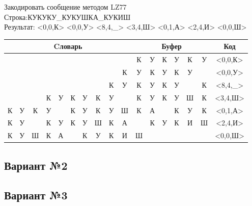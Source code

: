 \documentclass[a4paper, 12pt]{article}
\begin{document}
Закодировать сообщение методом LZ77\\
Строка:КУКУКУ\_КУКУШКА\_КУКИШ\\
Результат: <0,0,К> <0,0,У> <8,4,\_> <3,4,Ш> <0,1,А> <2,4,И> <0,0,Ш>\\
\begin{table}[h!]
\centering
\begin{tabular}{|c|c|c|c|c|c|c|c|c|c|c|c|c|c|c|c|c|} 
\hline
\multicolumn{10}{|c|}{Cловарь} & \multicolumn{6}{c|}{Буфер} & Код  \\ \hline
  &   &   &   &   &   &   &   &   &   & \cellcolor[HTML]{8CE4F6} К & У & К & У & К & У & <0,0,К>
\\ \hline
  &   &   &   &   &   &   &   &   & К & \cellcolor[HTML]{8CE4F6} У & К & У & К & У &   & <0,0,У>
\\ \hline
  &   &   &   &   &   &   &   & \cellcolor[HTML]{FFFF00} К & \cellcolor[HTML]{FFFF00} У & \cellcolor[HTML]{FFFF00} К & \cellcolor[HTML]{FFFF00} У & \cellcolor[HTML]{FFFF00} К & \cellcolor[HTML]{FFFF00} У & \cellcolor[HTML]{8CE4F6}   & К & <8,4,\_>
\\ \hline
  &   &   & \cellcolor[HTML]{FFFF00} К & \cellcolor[HTML]{FFFF00} У & \cellcolor[HTML]{FFFF00} К & \cellcolor[HTML]{FFFF00} У & К & У &   & \cellcolor[HTML]{FFFF00} К & \cellcolor[HTML]{FFFF00} У & \cellcolor[HTML]{FFFF00} К & \cellcolor[HTML]{FFFF00} У & \cellcolor[HTML]{8CE4F6} Ш & К & <3,4,Ш>
\\ \hline
\cellcolor[HTML]{FFFF00} К & У & К & У &   & К & У & К & У & Ш & \cellcolor[HTML]{FFFF00} К & \cellcolor[HTML]{8CE4F6} А &   & К & У & К & <0,1,А>
\\ \hline
К & У & \cellcolor[HTML]{FFFF00}   & \cellcolor[HTML]{FFFF00} К & \cellcolor[HTML]{FFFF00} У & \cellcolor[HTML]{FFFF00} К & У & Ш & К & А & \cellcolor[HTML]{FFFF00}   & \cellcolor[HTML]{FFFF00} К & \cellcolor[HTML]{FFFF00} У & \cellcolor[HTML]{FFFF00} К & \cellcolor[HTML]{8CE4F6} И & Ш & <2,4,И>
\\ \hline
К & У & Ш & К & А &   & К & У & К & И & \cellcolor[HTML]{8CE4F6} Ш &   &   &   &   &   & <0,0,Ш>
\\ \hline
\end{tabular}
\end{table}

\pagebreak
\subsection{Вариант №2}

\pagebreak
\subsection{Вариант №3}
\end{document}
